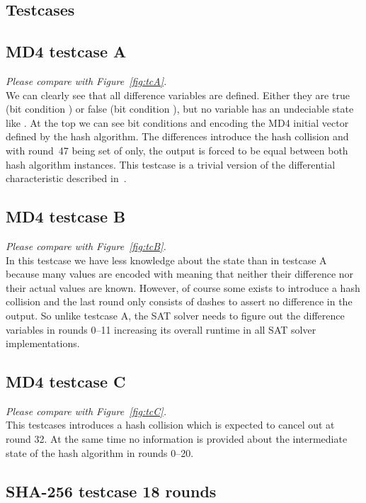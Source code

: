 \begin{appendices}
\chapter{Testcases}
\label{app:tc}
%
\section{MD4 testcase A}
\label{sec:tcA}
\emph{Please compare with Figure~\ref{fig:tcA}.} \\
We can clearly see that all difference variables are defined.
Either they are true (bit condition {\dnCx}) or false (bit condition {\dnCh}),
but no variable has an undeciable state like {\dnCq}. At the top we can see
bit conditions {\dnCz} and {\dnCo} encoding the MD4 initial vector defined
by the hash algorithm. The differences {\dnCx} introduce the hash collision
and with round~47 being set of {\dnCh} only, the output is forced to be
equal between both hash algorithm instances. This testcase
is a trivial version of the differential characteristic described
in~\cite{sasaki2007new}.

\section{MD4 testcase B}
\label{sec:tcB}
\emph{Please compare with Figure~\ref{fig:tcB}.} \\
In this testcase we have less knowledge about the state than in testcase A
because many values are encoded with {\dnCq} meaning that neither their
difference nor their actual values are known.
However, of course some {\dnCx} exists to introduce a hash collision
and the last round only consists of dashes to assert no difference
in the output.
So unlike testcase A, the SAT solver needs to figure out the difference
variables in rounds 0--11 increasing its overall runtime in all SAT solver
implementations.

\section{MD4 testcase C}
\label{sec:tcC}
\emph{Please compare with Figure~\ref{fig:tcC}.} \\
This testcases introduces a hash collision which is expected to cancel out
at round 32. At the same time no information is provided about the intermediate
state of the hash algorithm in rounds 0--20.

\section{SHA-256 testcase 18 rounds}
\label{sec:tc18}


\end{appendices}
